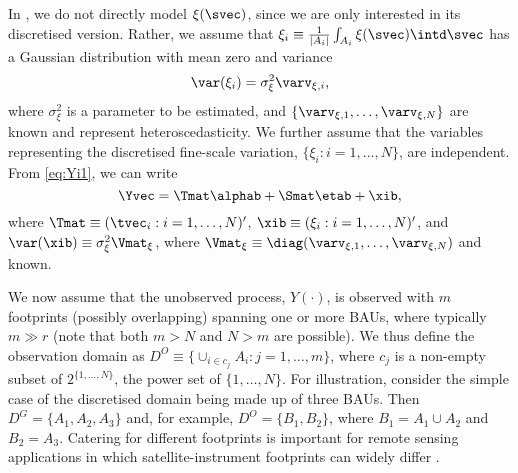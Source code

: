 In , we do not directly model $\xi(\svec)$, since we are only interested in its discretised version. Rather, we assume that $\xi_i \equiv \frac{1}{|A_i|}\int_{A_i} \xi(\svec)\intd\svec$ has a Gaussian distribution with mean zero and variance
\begin{equation}
\var(\xi_i) = \sigma^2_\xi \varv_{\xi,i},
\end{equation}
where $\sigma^2_\xi$ is a parameter to be estimated, and $\{\varv_{\xi,1},\dots,\varv_{\xi,N}\}$ are known and represent  heteroscedasticity. We further assume that the variables representing the discretised fine-scale variation, $\{\xi_i: i = 1,\dots,N\}$, are independent. From \eqref{eq:Yi1}, we can write
\begin{equation}\label{eq:SRE_Y}
\Yvec = \Tmat\alphab + \Smat\etab + \xib,
\end{equation}
where $\Tmat \equiv (\tvec_i: i = 1,\dots,N)'$, $\xib \equiv (\xi_i : i = 1,\dots,N)'$, and $\var(\xib) \equiv \sigma^2_\xi \Vmat_\xi$, where $\Vmat_\xi \equiv \diag(\varv_{\xi,1},\dots,\varv_{\xi,N})$ and known.

We now  assume that the unobserved process, $Y(\cdot)$, is observed with $m$ footprints (possibly overlapping) spanning one or more BAUs, where typically $m \gg r$ (note that both $m > N$ and $N >m$ are possible). We thus define the observation domain as $D^O \equiv \{ \cup_{i \in c_j} A_i : j = 1,\dots,m \}$, where $c_j$ is a non-empty subset of $2^{\{1,\dots,N\}}$, the power set of $\{1,\dots,N\}$. For illustration, consider the simple case of  the discretised domain being made up of three BAUs. Then $D^G = \{A_1,A_2,A_3\}$ and, for example, $D^O = \{B_1, B_2\}$, where $B_1 = A_1 \cup A_2$ and $B_2 = A_3$. Catering for different footprints is important for remote sensing applications in which satellite-instrument footprints can widely differ \citep[e.g.,][]{Nguyen_2012,Zammit_2015}.

